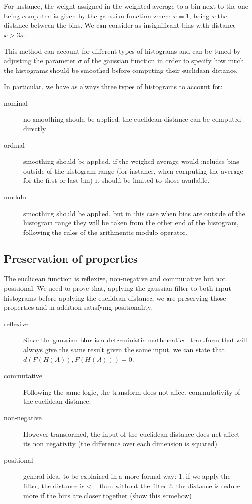 For instance, the weight assigned in the weighted average to a bin next to the one being computed is given by the gaussian function where $x = 1$, being $x$ the distance between the bins. We can consider as insignificant bins with distance $x > 3\sigma$.

This method can account for different types of histograms and can be tuned by adjusting the parameter $\sigma$ of the gaussian function in order to specify how much the histograms should be smoothed before computing their euclidean distance.

In particular, we have as always three types of histograms to account for:

\begin{description}
  \item[nominal] no smoothing should be applied, the euclidean distance can be computed directly
  \item[ordinal] smoothing should be applied, if the weighed average would includes bins outside of the histogram range (for instance, when computing the average for the first or last bin) it should be limited to those available.
  \item[modulo] smoothing should be applied, but in this case when bins are outside of the histogram range they will be taken from the other end of the histogram, following the rules of the arithmentic modulo operator.
\end{description}

\subsection{Preservation of properties}

The euclidean function is reflexive, non-negative and commutative but not positional. We need to prove that, applying the gaussian filter to both input histograms before applying the euclidean distance, we are preserving those properties and in addition satisfying positionality.

\begin{description}
  \item[reflexive] Since the gaussian blur is a deterministic mathematical transform that will always give the same result given the same input, we can state that \\
    $d(F(H(A)), F(H(A))) = 0$.
  \item[commutative] Following the same logic, the transform does not affect commutativity of the euclidean distance.
  \item[non-negative]
    However transformed, the input of the euclidean distance does not affect its non negativity (the difference over each dimension is squared).
  \item[positional] general idea, to be explained in a more formal way:
    1. if we apply the filter, the distance is <= than without the filter
    2. the distance is reduce more if the bins are closer together (show this somehow)
\end{description}

